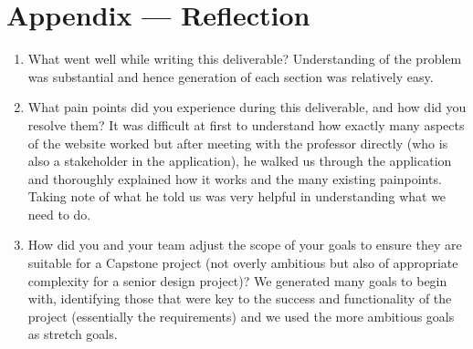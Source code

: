 \documentclass{article}
\begin{document}
\newpage{}

\section*{Appendix --- Reflection}



\begin{enumerate}
    \item What went well while writing this deliverable?
    \subitem Understanding of the problem was substantial and hence generation of each section was relatively easy.

    \item What pain points did you experience during this deliverable, and how
    did you resolve them?
    \subitem It was difficult at first to understand how exactly many aspects of the website worked but after meeting with the professor directly (who is also a stakeholder in the application), he walked us through the application and thoroughly explained how it works and the many existing painpoints. Taking note of what he told us was very helpful in understanding what we need to do.

    \item How did you and your team adjust the scope of your goals to ensure
    they are suitable for a Capstone project (not overly ambitious but also of
    appropriate complexity for a senior design project)?
    \subitem We generated many goals to begin with, identifying those that were key to the success and functionality of the project (essentially the requirements) and we used the more ambitious goals as stretch goals.
\end{enumerate}  
\end{document}
